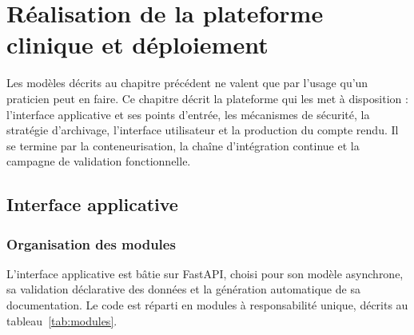 \chapter{Réalisation de la plateforme clinique et déploiement}
\label{chap:realisation-plateforme}

Les modèles décrits au chapitre précédent ne valent que par l'usage qu'un praticien
peut en faire. Ce chapitre décrit la plateforme qui les met à disposition :
l'interface applicative et ses points d'entrée, les mécanismes de sécurité, la
stratégie d'archivage, l'interface utilisateur et la production du compte rendu. Il se
termine par la conteneurisation, la chaîne d'intégration continue et la campagne de
validation fonctionnelle.

\section{Interface applicative}

\subsection{Organisation des modules}

L'interface applicative est bâtie sur FastAPI, choisi pour son modèle asynchrone, sa
validation déclarative des données et la génération automatique de sa documentation.
Le code est réparti en modules à responsabilité unique, décrits au
tableau~\ref{tab:modules}.

